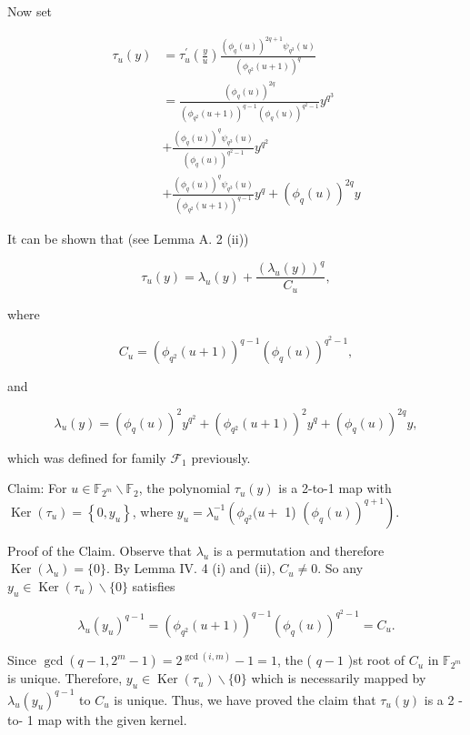\documentclass[10pt]{article}
\begin{document}
Now set

$$
\begin{aligned}
\tau_{u}(y) & =\tau_{u}^{\prime}\left(\frac{y}{u}\right) \frac{\left(\phi_{q}(u)\right)^{2 q+1} \psi_{q^{3}}(u)}{\left(\phi_{q^{2}}(u+1)\right)^{q}} \\
& =\frac{\left(\phi_{q}(u)\right)^{2 q}}{\left(\phi_{q^{2}}(u+1)\right)^{q-1}\left(\phi_{q}(u)\right)^{q^{2}-1}} y^{q^{3}} \\
& +\frac{\left(\phi_{q}(u)\right)^{q} \psi_{q^{3}}(u)}{\left(\phi_{q}(u)\right)^{q^{2}-1}} y^{q^{2}} \\
& +\frac{\left(\phi_{q}(u)\right)^{q} \psi_{q^{3}}(u)}{\left(\phi_{q^{2}}(u+1)\right)^{q-1}} y^{q}+\left(\phi_{q}(u)\right)^{2 q} y
\end{aligned}
$$

It can be shown that (see Lemma A. 2 (ii))

$$
\tau_{u}(y)=\lambda_{u}(y)+\frac{\left(\lambda_{u}(y)\right)^{q}}{C_{u}},
$$

where

$$
C_{u}=\left(\phi_{q^{2}}(u+1)\right)^{q-1}\left(\phi_{q}(u)\right)^{q^{2}-1},
$$

and

$$
\lambda_{u}(y)=\left(\phi_{q}(u)\right)^{2} y^{q^{2}}+\left(\phi_{q^{2}}(u+1)\right)^{2} y^{q}+\left(\phi_{q}(u)\right)^{2 q} y,
$$

which was defined for family $\mathcal{F}_{1}$ previously.

Claim: For $u \in \mathbb{F}_{2^{m}} \backslash \mathbb{F}_{2}$, the polynomial $\tau_{u}(y)$ is a 2-to-1 map with $\operatorname{Ker}\left(\tau_{u}\right)=\left\{0, y_{u}\right\}$, where $y_{u}=\lambda_{u}^{-1}\left(\phi_{q^{2}}(u+\right.$ 1) $\left.\left(\phi_{q}(u)\right)^{q+1}\right)$.

Proof of the Claim. Observe that $\lambda_{u}$ is a permutation and therefore $\operatorname{Ker}\left(\lambda_{u}\right)=\{0\}$. By Lemma IV. 4 (i) and (ii), $C_{u} \neq 0$. So any $y_{u} \in \operatorname{Ker}\left(\tau_{u}\right) \backslash\{0\}$ satisfies

$$
\lambda_{u}\left(y_{u}\right)^{q-1}=\left(\phi_{q^{2}}(u+1)\right)^{q-1}\left(\phi_{q}(u)\right)^{q^{2}-1}=C_{u} .
$$

Since $\operatorname{gcd}\left(q-1,2^{m}-1\right)=2^{\operatorname{gcd}(i, m)}-1=1$, the ( $q-1$ )st root of $C_{u}$ in $\mathbb{F}_{2^{m}}$ is unique. Therefore, $y_{u} \in \operatorname{Ker}\left(\tau_{u}\right) \backslash\{0\}$ which is necessarily mapped by $\lambda_{u}\left(y_{u}\right)^{q-1}$ to $C_{u}$ is unique. Thus, we have proved the claim that $\tau_{u}(y)$ is a 2 -to- 1 map with the given kernel.
\end{document}
